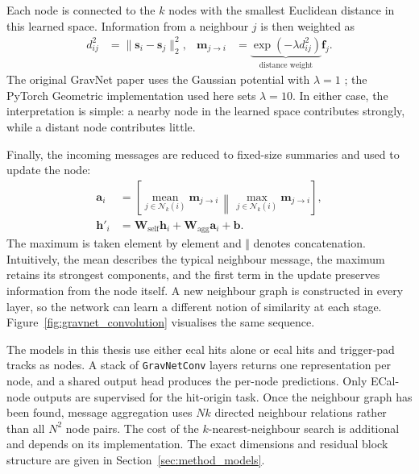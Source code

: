 Each node is connected to the \(k\) nodes with the smallest Euclidean distance
in this learned space. Information from a neighbour \(j\) is then weighted as
\begin{align}
    d_{ij}^{2}
    &= \lVert\mathbf{s}_i-\mathbf{s}_j\rVert_2^2,
    &
    \mathbf{m}_{j\rightarrow i}
    &= \underbrace{\exp(-\lambda d_{ij}^{2})}_{\text{distance weight}}
       \mathbf{f}_j.
    \label{eq:gravnet_message}
\end{align}
The original GravNet paper uses the Gaussian potential with \(\lambda=1\)
\cite{qasim2019-gravnet}; the PyTorch Geometric implementation
\cite{fey2019-pytorch-geometric} used here sets \(\lambda=10\). In either case,
the interpretation is simple: a nearby node in the learned space contributes
strongly, while a distant node contributes little.

Finally, the incoming messages are reduced to fixed-size summaries and used to
update the node:
\begin{align}
    \mathbf{a}_i
    &=
    \left[
        \underset{j\in\mathcal{N}_k(i)}{\operatorname{mean}}
        \mathbf{m}_{j\rightarrow i}
        \,\middle\Vert\,
        \underset{j\in\mathcal{N}_k(i)}{\operatorname{max}}
        \mathbf{m}_{j\rightarrow i}
    \right],
    \label{eq:gravnet_aggregation}\\
    \mathbf{h}'_i
    &=
    \mathbf{W}_{\mathrm{self}}\mathbf{h}_i
    +
    \mathbf{W}_{\mathrm{agg}}\mathbf{a}_i
    +\mathbf{b}.
    \label{eq:gravnet_update}
\end{align}
The maximum is taken element by element and \(\Vert\) denotes concatenation.
Intuitively, the mean describes the typical neighbour message, the maximum
retains its strongest components, and the first term in the update preserves
information from the node itself. A new neighbour graph is constructed in
every layer, so the network can learn a different notion of similarity at
each stage. Figure~\ref{fig:gravnet_convolution} visualises the same sequence.



The models in this thesis use either \gls{ecal} hits alone or \gls{ecal} hits
and trigger-pad tracks as nodes. A stack of \texttt{GravNetConv} layers
returns one representation per node, and a shared output head produces the
per-node predictions. Only ECal-node outputs are supervised for the
hit-origin task. Once the neighbour graph has been found, message aggregation
uses \(Nk\) directed neighbour relations rather than all \(N^2\) node pairs.
The cost of the \(k\)-nearest-neighbour search is additional and depends on
its implementation. The exact dimensions and residual block structure are
given in Section~\ref{sec:method_models}.









